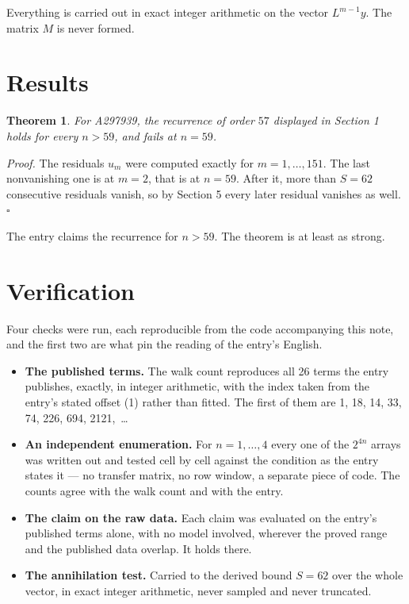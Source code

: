 \documentclass[11pt]{article}
\newtheorem{theorem}{Theorem}
\theoremstyle{definition}
\begin{document}
Everything is carried out in exact integer arithmetic on the vector $L^{m-1}y$. The matrix $M$ is never formed.

\section{Results}

\begin{theorem} For A297939, the recurrence of order $57$ displayed in Section 1 holds for every $n > 59$, and fails at $n = 59$.\end{theorem}

{\itshape Proof.} The residuals $u_m$ were computed exactly for $m = 1,\dots,151$. The last nonvanishing one is at $m = 2$, that is at $n = 59$. After it, more than $S = 62$ consecutive residuals vanish, so by Section 5 every later residual vanishes as well. $\square$

The entry claims the recurrence for $n > 59$. The theorem is at least as strong.

\section{Verification}

Four checks were run, each reproducible from the code accompanying this note, and the first two are what pin the reading of the entry's English.

\begin{itemize}

\item {\bfseries The published terms.} The walk count reproduces all 26 terms the entry publishes, exactly, in integer arithmetic, with the index taken from the entry's stated offset (1) rather than fitted. The first of them are 1, 18, 14, 33, 74, 226, 694, 2121,~\dots

\item {\bfseries An independent enumeration.} For $n = 1,\dots,4$ every one of the $2^{4n}$ arrays was written out and tested cell by cell against the condition as the entry states it --- no transfer matrix, no row window, a separate piece of code. The counts agree with the walk count and with the entry.

\item {\bfseries The claim on the raw data.} Each claim was evaluated on the entry's published terms alone, with no model involved, wherever the proved range and the published data overlap. It holds there.

\item {\bfseries The annihilation test.} Carried to the derived bound $S = 62$ over the whole vector, in exact integer arithmetic, never sampled and never truncated.

\end{itemize}
\end{document}

